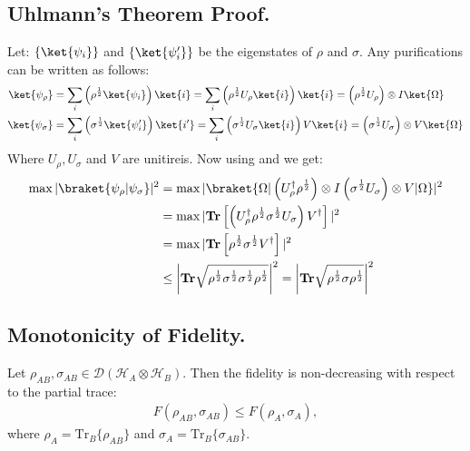 \documentclass[12pt,a4paper]{article}
\begin{document}
\subsection{Uhlmann's Theorem Proof.} 

Let: $\{\ket{\psi_i}\}$ and $\{\ket{\psi_i^\prime}\}$ be the eigenstates of $\rho$ and $\sigma$. Any purifications can be written as follows:
\begin{equation*}
  \begin{split}
    \ket{\psi_\rho} & = \sum_{i}{ \left( \rho^{\frac{1}{2}}\ket{\psi_i} \right) \ket{i} } = \sum_{i}{ \left( \rho^{\frac{1}{2}} U_{\rho} \ket{i} \right) \ket{i} }  =  \left( \rho^{\frac{1}{2}} U_{\rho} \right) \otimes I \ket{ \Omega } \\ 
  \ket{\psi_\sigma} & = \sum_{i}{ \left( \sigma^{\frac{1}{2}}\ket{\psi^\prime_i} \right) \ket{i^\prime} } =  
  \sum_{i}{ \left( \sigma^{\frac{1}{2}} U_{\sigma} \ket{i} \right)  V \ket{i} }  =  \left( \sigma^{\frac{1}{2}} U_{\sigma} \right) \otimes V \ket{\Omega} 
  \end{split}
\end{equation*}
Where $U_{\rho},U_{\sigma}$ and $V$ are unitireis. Now using  and  we get:
\begin{equation*}
  \begin{split}
    \max | \braket{ \psi_\rho | \psi_\sigma } |^2  & = \max  | \braket{\Omega |   \left( U_{\rho}^{\dagger} \rho^{\frac{1}{2}}  \right) \otimes I   \left( \sigma^{\frac{1}{2}} U_{\sigma} \right) \otimes V     | \Omega}  |^{2} \\
  & = \max |     \mathbf{Tr} \left[  \left( U_{\rho}^{\dagger} \rho^{\frac{1}{2}}   \sigma^{\frac{1}{2}} U_{\sigma} \right)  V^\dagger\right]    |^{2} \\
  & = \max |     \mathbf{Tr} \left[  \rho^{\frac{1}{2}}   \sigma^{\frac{1}{2}}   V^\dagger\right]    |^{2} \\
  & \le \left|   \mathbf{Tr} \sqrt{      \rho^{\frac{1}{2}} \sigma^{\frac{1}{2}} \sigma^{\frac{1}{2}}\rho^{\frac{1}{2}}   }   \right|^{2} = \left|   \mathbf{Tr} \sqrt{      \rho^{\frac{1}{2}} \sigma \rho^{\frac{1}{2}}   }   \right|^{2}  \\
  \end{split}
\end{equation*}

\subsection{Monotonicity of Fidelity.}
Let $\rho_{AB}, \sigma_{AB} \in \mathcal{D}(\mathcal{H}_A \otimes \mathcal{H}_B)$. Then the fidelity is non-decreasing with respect to the partial trace:
\begin{equation*}
  \begin{split}
  F(\rho_{AB}, \sigma_{AB}) \leq F(\rho_A, \sigma_A),
  \end{split}
\end{equation*}
where $\rho_A = \mathrm{Tr}_B\{\rho_{AB}\}$ and $\sigma_A = \mathrm{Tr}_B\{\sigma_{AB}\}$.
\end{document}
